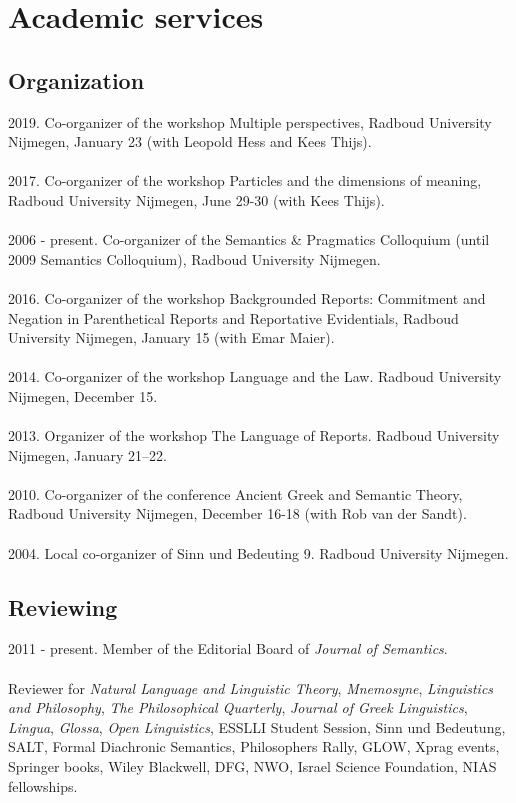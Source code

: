 \documentclass[a4paper,11pt]{article}
\begin{document}
\section*{Academic services%
}

\subsection*{Organization}
2019. Co-organizer of the workshop Multiple perspectives, Radboud University Nijmegen, January 23 (with Leopold Hess and Kees Thijs).\\\\
2017. Co-organizer of the workshop Particles and the dimensions of meaning, Radboud University Nijmegen, June 29-30 (with Kees Thijs).\\\\
2006 - present. Co-organizer of the Semantics \& Pragmatics Colloquium (until 2009 Semantics Colloquium), Radboud University Nijmegen.\\\\
2016. Co-organizer of the workshop Backgrounded Reports: Commitment and Negation in Parenthetical Reports and Reportative Evidentials, Radboud University Nijmegen, January 15 (with Emar Maier).\\\\
2014. Co-organizer of the workshop Language and the Law. Radboud University Nijmegen, December 15.\\\\
2013. Organizer of the workshop The Language of Reports. Radboud University Nijmegen, January 21--22.\\\\
2010. Co-organizer of the conference Ancient Greek and Semantic Theory, Radboud University Nijmegen, December 16-18 (with Rob van der Sandt).\\\\
 2004. Local co-organizer of Sinn und Bedeuting 9. Radboud University Nijmegen.


\subsection*{Reviewing}

2011 - present. Member of the Editorial Board of \emph{Journal of Semantics}.\\\\
Reviewer for  \emph{Natural Language and Linguistic Theory}, \emph{Mnemosyne}, \emph{Linguistics and Philosophy}, \emph{The Philosophical Quarterly}, \emph{Journal of Greek Linguistics}, \emph{Lingua}, \emph{Glossa},  \emph{Open Linguistics}, ESSLLI Student Session, Sinn und Bedeutung, SALT, Formal Diachronic Semantics, Philosophers Rally, GLOW, Xprag events, Springer books, Wiley Blackwell, DFG, NWO, Israel Science Foundation, NIAS fellowships.
\end{document}
